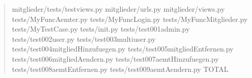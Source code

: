 \documentclass[letterpaper,10pt,english]{sphinxmanual}
\begin{document}
\begin{quote}
\begin{sphinxVerbatim}[commandchars=\\\{\}]
mitglieder/tests/test\PYGZus{}views.py                             \PYGZpc{}
mitglieder/urls.py                                          \PYGZpc{}
mitglieder/views.py                                       \PYGZpc{}
tests/MyFuncAemter.py                                      \PYGZpc{}
tests/MyFuncLogin.py                                        \PYGZpc{}
tests/MyFuncMitglieder.py                                 \PYGZpc{}
tests/MyTestCase.py                                         \PYGZpc{}
tests/\PYGZus{}\PYGZus{}init\PYGZus{}\PYGZus{}.py                                           \PYGZpc{}
tests/test\PYGZus{}001\PYGZus{}admin.py                                     \PYGZpc{}
tests/test\PYGZus{}002\PYGZus{}user.py                                      \PYGZpc{}
tests/test\PYGZus{}003\PYGZus{}multiuser.py                                 \PYGZpc{}
tests/test\PYGZus{}004\PYGZus{}mitgliedHinzufuegen.py                       \PYGZpc{}
tests/test\PYGZus{}005\PYGZus{}mitgliedEntfernen.py                        \PYGZpc{}
tests/test\PYGZus{}006\PYGZus{}mitgliedAendern.py                          \PYGZpc{}
tests/test\PYGZus{}007\PYGZus{}aemtHinzufuegen.py                          \PYGZpc{}
tests/test\PYGZus{}008\PYGZus{}aemtEntfernen.py                            \PYGZpc{}
tests/test\PYGZus{}009\PYGZus{}aemtAendern.py                              \PYGZpc{}
\PYGZhy{}\PYGZhy{}\PYGZhy{}\PYGZhy{}\PYGZhy{}\PYGZhy{}\PYGZhy{}\PYGZhy{}\PYGZhy{}\PYGZhy{}\PYGZhy{}\PYGZhy{}\PYGZhy{}\PYGZhy{}\PYGZhy{}\PYGZhy{}\PYGZhy{}\PYGZhy{}\PYGZhy{}\PYGZhy{}\PYGZhy{}\PYGZhy{}\PYGZhy{}\PYGZhy{}\PYGZhy{}\PYGZhy{}\PYGZhy{}\PYGZhy{}\PYGZhy{}\PYGZhy{}\PYGZhy{}\PYGZhy{}\PYGZhy{}\PYGZhy{}\PYGZhy{}\PYGZhy{}\PYGZhy{}\PYGZhy{}\PYGZhy{}\PYGZhy{}\PYGZhy{}\PYGZhy{}\PYGZhy{}\PYGZhy{}\PYGZhy{}\PYGZhy{}\PYGZhy{}\PYGZhy{}\PYGZhy{}\PYGZhy{}\PYGZhy{}\PYGZhy{}\PYGZhy{}\PYGZhy{}\PYGZhy{}\PYGZhy{}\PYGZhy{}\PYGZhy{}\PYGZhy{}\PYGZhy{}\PYGZhy{}\PYGZhy{}\PYGZhy{}\PYGZhy{}\PYGZhy{}\PYGZhy{}
TOTAL                                                   \PYGZpc{}
\end{sphinxVerbatim}
\end{quote}
\end{document}
